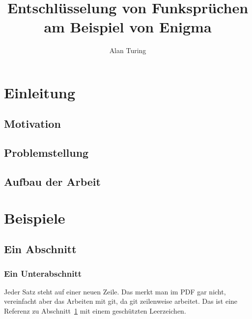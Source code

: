 \documentclass{iwi}
\title{Entschlüsselung von Funksprüchen am Beispiel von Enigma}
\author{Alan Turing}
\begin{document}



	
\tableofcontents 	%
\listoffigures 		%
\listoftables 		%
\lstlistoflistings	%





\newpage
\setcounter{frontpages}{\value{page}}
\onehalfspacing %

\chapter{Einleitung} \label{chap:Einleitung}

\section{Motivation} \label{sec:Motivation}

\section{Problemstellung} \label{sec:Problemstellung}

\section{Aufbau der Arbeit} \label{sec:Aufbau}

\chapter{Beispiele} \label{chap:Beispiele}

\section{Ein Abschnitt} \label{sec:Abschnitt}

\subsection{Ein Unterabschnitt} \label{sec:Unterabschnitt}

Jeder Satz steht auf einer neuen Zeile.
Das merkt man im PDF gar nicht, vereinfacht aber das Arbeiten mit git, da git zeilenweise arbeitet.
Das ist eine Referenz zu Abschnitt~\ref{chap:Einleitung} mit einem geschützten Leerzeichen.
\end{document}
